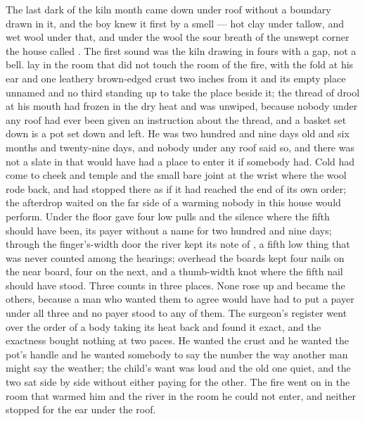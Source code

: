 
The last dark of the kiln month came down under  roof without a boundary drawn in it, and the boy knew it first by a smell --- hot clay under tallow, and wet wool under that, and under the wool the sour breath of the unswept corner the house called . The first sound was the kiln drawing in fours with a gap, not a bell.  lay in the room that did not touch the room of the fire, with the fold at his ear and one leathery brown-edged crust two inches from it and its empty place unnamed and no third standing up to take the place beside it; the thread of drool at his mouth had frozen in the dry heat and was unwiped, because nobody under any roof had ever been given an instruction about the thread, and a basket set down is a pot set down and left. He was two hundred and nine days old and six months and twenty-nine days, and nobody under any roof said so, and there was not a slate in  that would have had a place to enter it if somebody had. Cold had come to cheek and temple and the small bare joint at the wrist where the wool rode back, and had stopped there as if it had reached the end of its own order; the afterdrop waited on the far side of a warming nobody in this house would perform. Under the floor  gave four low pulls and the silence where the fifth should have been, its payer without a name for two hundred and nine days; through the finger's-width door the river kept its note of , a fifth low thing that was never counted among the hearings; overhead the boards kept four nails on the near board, four on the next, and a thumb-width knot where the fifth nail should have stood. Three counts in three places. None rose up and became the others, because a man who wanted them to agree would have had to put a payer under all three and no payer stood to any of them. The surgeon's register went over the order of a body taking its heat back and found it exact, and the exactness bought nothing at two paces. He wanted the crust and he wanted the pot's handle and he wanted somebody to say the number the way another man might say the weather; the child's want was loud and the old one quiet, and the two sat side by side without either paying for the other. The fire went on in the room that warmed him and the river in the room he could not enter, and neither stopped for the ear under the roof.

